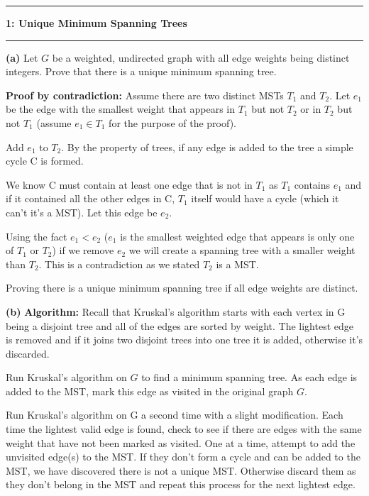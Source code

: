 \documentclass[11pt]{article}
\newcommand\question[2]{\vspace{.25in}\hrule\textbf{#1: #2}\vspace{.5em}\hrule\vspace{.10in}}
\renewcommand\part[1]{\vspace{.10in}\textbf{(#1)}}
\newcommand\algorith{\vspace{.10in}\textbf{Algorithm: }}
\begin{document}
\raggedright
\newcommand\NAME{Jake Pitkin}  %
\newcommand\UID{u0891770}     %
\newcommand\HWNUM{3}              %

\question{1}{Unique Minimum Spanning Trees}

\part{a} Let $G$ be a weighted, undirected graph with all edge weights being distinct integers. Prove that there is a unique minimum spanning tree.

\textbf{Proof by contradiction:} Assume there are two distinct MSTs $T_1$ and $T_2$. Let $e_1$ be the edge with the smallest weight that appears in $T_1$ but not $T_2$ or in $T_2$ but not $T_1$ (assume $e_1 \in T_1$ for the purpose of the proof).

	Add $e_1$ to $T_2$. By the property of trees, if any edge is added to the tree a simple cycle C is formed.
	
	We know C must contain at least one edge that is not in $T_1$ as $T_1$ contains $e_1$ and if it contained all the other edges in C, $T_1$ itself would have a cycle (which it can't it's a MST). Let this edge be $e_2$.
	
	Using the fact $e_1 < e_2$ ($e_1$ is the smallest weighted edge that appears is only one of $T_1$ or $T_2$) if we remove $e_2$ we will create a spanning tree with a smaller weight than $T_2$. This is a contradiction as we stated $T_2$ is a MST.
	
	Proving there is a unique minimum spanning tree if all edge weights are distinct.
	
\part{b} \algorith Recall that Kruskal's algorithm starts with each vertex in G being a disjoint tree and all of the edges are sorted by weight. The lightest edge is removed and if it joins two disjoint trees into one tree it is added, otherwise it's discarded.

Run Kruskal's algorithm on $G$ to find a minimum spanning tree. As each edge is added to the MST, mark this edge as visited in the original graph $G$.

Run Kruskal's algorithm on G a second time with a slight modification. Each time the lightest valid edge is found, check to see if there are edges with the same weight that have not been marked as visited. One at a time, attempt to add the unvisited edge(s) to the MST. If they don't form a cycle and can be added to the MST, we have discovered there is not a unique MST. Otherwise discard them as they don't belong in the MST and repeat this process for the next lightest edge.
\end{document}
